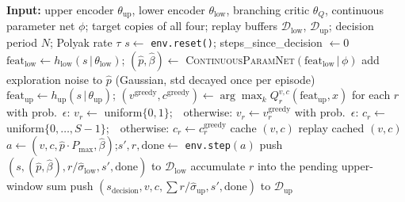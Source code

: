 \begin{algorithm}[htbp]
\caption{BMPP-DQN training loop}
\label{alg:bmpp-dqn}
\footnotesize
\begin{algorithmic}[1]
\State \textbf{Input:} upper encoder $\theta_{\mathrm{up}}$, lower encoder
  $\theta_{\mathrm{low}}$, branching critic $\theta_Q$, continuous
  parameter net $\phi$; target copies of all four; replay buffers
  $\mathcal{D}_{\mathrm{low}}$, $\mathcal{D}_{\mathrm{up}}$; decision
  period $N$; Polyak rate $\tau$
  \State $s \gets$ \texttt{env.reset()}; steps\_since\_decision $\gets 0$
    \State $\mathrm{feat}_{\mathrm{low}} \gets h_{\mathrm{low}}(s\,|\,\theta_{\mathrm{low}})$;\quad
      $(\hat p, \hat\beta) \gets$ \textsc{ContinuousParamNet}$(\mathrm{feat}_{\mathrm{low}}\,|\,\phi)$
    \State add exploration noise to $\hat p$ (Gaussian, std decayed once per episode)
      \State $\mathrm{feat}_{\mathrm{up}} \gets h_{\mathrm{up}}(s\,|\,\theta_{\mathrm{up}})$;\quad
        $(v^{\mathrm{greedy}}, c^{\mathrm{greedy}}) \gets \arg\max_k Q^{v,c}_r(\mathrm{feat}_{\mathrm{up}}, x)$ for each $r$ 
       
        \State with prob.\ $\epsilon$: $v_r \gets$ uniform$\{0,1\}$;\ \ otherwise: $v_r \gets v_r^{\mathrm{greedy}}$
        \State with prob.\ $\epsilon$: $c_r \gets$ uniform$\{0,\dots,S-1\}$;\ \ otherwise: $c_r \gets c_r^{\mathrm{greedy}}$
      \EndFor
      \Statex {}
      \State cache $(v, c)$
    \Else
      \State replay cached $(v, c)$
    \EndIf
    \State $a \gets (v, c, \hat p \cdot P_{\max}, \hat\beta)$;\quad $s', r, \mathrm{done} \gets$ \texttt{env.step}$(a)$
    \State push $(s, (\hat p, \hat\beta), r/\hat\sigma_{\mathrm{low}}, s', \mathrm{done})$ to $\mathcal{D}_{\mathrm{low}}$ 
    \State accumulate $r$ into the pending upper-window sum
      \State push $(s_{\mathrm{decision}}, v, c, \sum r / \hat\sigma_{\mathrm{up}}, s', \mathrm{done})$ to $\mathcal{D}_{\mathrm{up}}$
    \EndIf
    \State {} 
    \State {} 
\end{algorithmic}
\end{algorithm}
